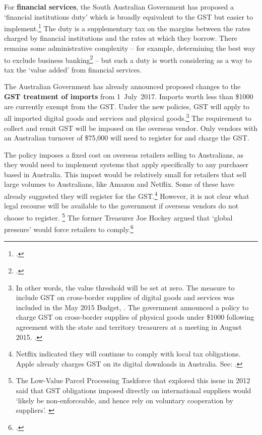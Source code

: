 For \textbf{financial services}, the South Australian Government has proposed a ‘financial institutions duty’ which is broadly equivalent to the GST but easier to implement.\footcites{Evans2015}{Weatherill2015}  The duty is a supplementary tax on the margins between the rates charged by financial institutions and the rates at which they borrow. There remains some administrative complexity – for example, determining the best way to exclude business banking\footcite{Davis2015}  – but such a duty is worth considering as a way to tax the ‘value added’ from financial services. 

The Australian Government has already announced proposed changes to the \textbf{GST treatment of imports} from 1~July~2017. Imports worth less than \$1000 are currently exempt from the GST\@. Under the new policies, GST will apply to all imported digital goods and services and physical goods.\footnote{In other words, the value threshold will be set at zero. The measure to include GST on cross-border supplies of digital goods and services was included in the May 2015 Budget,
\textcite[][20]{Treasury2015BudgetPapers201516}. The government announced a policy to charge GST on cross-border supplies of physical goods under \$1000 following agreement with the state and territory treasurers at a meeting in August 2015. \textcite{Hockey2015--GST-import-threshold}.}  The requirement to collect and remit GST will be imposed on the overseas vendor. Only vendors with an Australian turnover of \$75,000 will need to register for and charge the GST.

The policy imposes a fixed cost on overseas retailers selling to Australians, as they would need to implement systems that apply specifically to any purchaser based in Australia. This impost would be relatively small for retailers that sell large volumes to Australians, like Amazon and Netflix. Some of these have already suggested they will register for the GST.\footnote{Netflix indicated they will continue to comply with local tax obligations. Apple already charges GST on its digital downloads in Australia. See: \textcite{Coorey2015-Netflix}.}  However, it is not clear what legal recourse will be available to the government if overseas vendors do not choose to register.%
\footnote{The Low-Value Parcel Processing Taskforce that explored this issue in 2012 said that GST obligations imposed directly on international suppliers would ‘likely be non-enforceable, and hence rely on voluntary cooperation by suppliers’. \textcite[][139]{Treasury2012c}}  The former Treasurer Joe Hockey argued that ‘global pressure’ would force retailers to comply.\footcite{Hockey2015--GST-import-threshold}  

